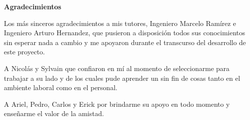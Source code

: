 \documentclass[../principal.tex]{subfiles}
\begin{document}
  \thispagestyle{empty}
  \begin{center}
    \textbf{Agradecimientos}  
  \end{center}

  Los más sinceros agradecimientos a mis tutores, Ingeniero Marcelo Ramírez e Ingeniero Arturo Hernandez, que pusieron a disposición todos sus conocimientos sin esperar nada a cambio y me apoyaron durante el transcurso del desarrollo de este proyecto.

  A Nicolás y Sylvain que confiaron en mí al momento de seleccionarme para trabajar a su lado y de los cuales pude aprender un sin fin de cosas tanto en el ambiente laboral como en el personal.

  A Ariel, Pedro, Carlos y Erick por brindarme su apoyo en todo momento y enseñarme el valor de la amistad.

  \newpage
\end{document}
